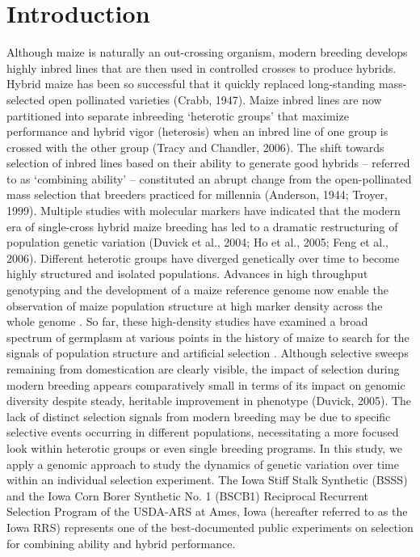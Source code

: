 \section*{Introduction}
Although maize is naturally an out-crossing organism, modern breeding develops highly inbred lines that are then used in controlled crosses to produce hybrids. Hybrid maize has been so successful that it quickly replaced long-standing mass-selected open pollinated varieties (Crabb, 1947). 
Maize inbred lines are now partitioned into separate inbreeding ‘heterotic groups’ that maximize performance and hybrid vigor (heterosis) when an inbred line of one group is crossed with the other group (Tracy and Chandler, 2006). 
The shift towards selection of inbred lines based on their ability to generate good hybrids – referred to as ‘combining ability’ – constituted an abrupt change from the open-pollinated mass selection that breeders practiced for millennia (Anderson, 1944; Troyer, 1999).
Multiple studies with molecular markers have indicated that the modern era of single-cross hybrid maize breeding has led to a dramatic restructuring of population genetic variation (Duvick et al., 2004; Ho et al., 2005; Feng et al., 2006). 
Different heterotic groups have diverged genetically over time to become highly structured and isolated populations. 
Advances in high throughput genotyping and the development of a maize reference genome now enable the observation of maize population structure at high marker density across the whole genome \citep{ganal2011a-large,chia2012maize}. 
So far, these high-density studies have examined a broad spectrum of germplasm at various points in the history of maize to search for the signals of population structure and artificial selection \citep{Hufford2012b, van2012historical}. 
Although selective sweeps remaining from domestication are clearly visible, the impact of selection during modern breeding appears comparatively small in terms of its impact on genomic diversity despite steady, heritable improvement in phenotype (Duvick, 2005). 
The lack of distinct selection signals from modern breeding may be due to specific selective events occurring in different populations, necessitating a more focused look within heterotic groups or even single breeding programs. 
In this study, we apply a genomic approach to study the dynamics of genetic variation over time within an individual selection experiment. 
The Iowa Stiff Stalk Synthetic (BSSS) and the Iowa Corn Borer Synthetic No. 1 (BSCB1) Reciprocal Recurrent Selection Program of the USDA-ARS at Ames, Iowa (hereafter referred to as the Iowa RRS) represents one of the best-documented public experiments on selection for combining ability and hybrid performance. 
